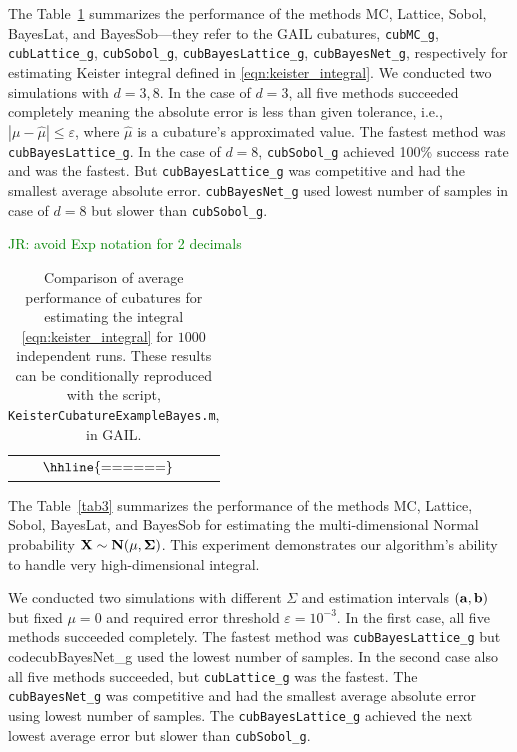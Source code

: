 \documentclass{iitthesis}          %
\newcommand{\code}[1]{\texttt{#1}}
\newcommand{\JRNote}[1]{{\textcolor{green}{JR: #1}}}
\begin{document}
{{{{{{
The Table~\ref{tab2} summarizes the performance of the methods MC, Lattice, Sobol,
BayesLat, and BayesSob---they refer to the GAIL cubatures, \texttt{cubMC\_g},
\code{cubLattice\_g}, \code{cubSobol\_g},  \code{cubBayesLattice\_g},  \code{cubBayesNet\_g},
respectively for estimating Keister integral defined in \eqref{eqn:keister_integral}.
We conducted two simulations with $d=3,8$. In the case of $d=3$, all five methods succeeded completely meaning the
absolute error is less than given tolerance, i.e., $|\mu - \hat{\mu}| \le
\varepsilon$, where $\hat{\mu}$ is a cubature's approximated value. The
fastest method was \code{cubBayesLattice\_g}.
In the case of $d=8$,   \code{cubSobol\_g} achieved 100\% success rate
and was the fastest. But \code{cubBayesLattice\_g}  was competitive and
had the smallest average absolute error. \code{cubBayesNet\_g} used lowest number of samples in case of $d=8$ but slower than \code{cubSobol\_g}.

\JRNote{avoid Exp notation for 2 decimals}
\begin{table}[ht] %
\centering
\caption{Comparison of average performance of cubatures for estimating the integral \eqref{eqn:keister_integral}
for $1000$ independent runs. These results can be conditionally reproduced with the
script, \code{KeisterCubatureExampleBayes.m}, in GAIL. 
\label{tab2}}	   
\begin{tabular}{c}
$
\arraycolsep=1.4pt\def\arraystretch{0.9}
\begin{array}{l@{\quad}r@{\quad}r@{\quad}r@{\quad}r@{\quad}r@{\quad}r}
\hhline{======}
 
\end{array}
$
\end{tabular}
\end{table}





The Table~\ref{tab3} summarizes the performance of the methods MC, Lattice, Sobol,
BayesLat, and BayesSob for estimating the multi-dimensional Normal probability $\bf{X}\sim N(\bf{\mu},\Sigma)$. This experiment demonstrates our algorithm's ability to handle very high-dimensional integral.

We conducted two simulations with different $\Sigma$ and estimation intervals $(\bf{a}, \bf{b})$ but fixed $\mu=0$ and required error threshold $\varepsilon=10^{-3}$. In the first case, all five methods succeeded completely. 
The fastest method was \code{cubBayesLattice\_g} but code{cubBayesNet\_g} used the lowest number of samples.
In the second case also all five methods succeeded,  but \code{cubLattice\_g} was the fastest. 
The \code{cubBayesNet\_g}  was competitive and had the smallest average absolute error using lowest number of samples. The \code{cubBayesLattice\_g} achieved the next lowest average error but slower than \code{cubSobol\_g}.

}}}}}}
\end{document}
